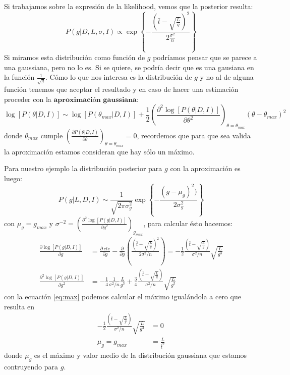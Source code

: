 \documentclass[aps,onecolumn,12pt,notitlepage]{revtex4-1}
\begin{document}
Si trabajamos sobre la expresión de la likelihood, vemos que la posterior resulta:
\begin{equation}
\displaystyle{P(g|D,L,\sigma,I) \propto \exp \left\{ -\frac{\left(\bar{t} - \sqrt{\frac{L}{g}}\right)^2}{2\frac{\sigma^2}{n}} \right\}}
\end{equation}
Si miramos esta distribución como función de $g$ podríamos pensar que se parece a una gaussiana, pero no lo es. Si se quiere, se podría decir que es una gausiana en la función $\frac{1}{\sqrt{g}}$. Cómo lo que nos interesa es la distribución de $g$ y no al de alguna función tenemos que aceptar el resultado y en caso de hacer una estimación proceder con la $\textbf{aproximación gaussiana}$:
\begin{equation}
 \displaystyle \log\left[P(\theta|D,I)\right] \sim \log\left[P(\theta_{max}|D,I)\right] + \frac{1}{2} \left(\frac{\partial^2 \log\left[P(\theta|D,I)\right] }{\partial \theta^2}\right)_{\theta =  \theta_{max}}\left(\theta-\theta_{max}\right)^2
\end{equation}
donde $\theta_{max}$ cumple $\left(\frac{\partial P(\theta|D,I)}{\partial \theta} \right)_{\theta= \theta_{max}} = 0$, recordemos que para que sea valida la aproximación estamos consideran que hay sólo un máximo.

Para nuestro ejemplo la distribución posterior para $g$ con la aproximación es luego:
\begin{equation}
P(g|L,D,I) \sim \frac{1}{\sqrt{2\pi\sigma^2_{g}}} \exp \left\{-\frac{(g-\mu_{g})^2)}{2\sigma_{g}^2}\right\}
\end{equation}
con $\mu_{g} = g_{max}$ y $ \sigma^{-2} = \left( \frac{\partial^2 \log \left[ P(g|D,I) \right] }{\partial g^2} \right)_{g_{max}}$, para calcular ésto hacemos:
\begin{align}
\frac{\partial \log \left[ P(g|D,I) \right]}{\partial g} &= \frac{\partial \ cte}{\partial g} - \frac{\partial}{\partial g}\left(\frac{\left(\bar{t}-\sqrt{\frac{L}{g}}\right)^2}{2\sigma^{2}/n}\right) = -\frac{1}{2}\frac{(\bar{t}-\sqrt{\frac{L}{g}})}{\sigma^2/n}\sqrt{\frac{L}{g^{3}}} 
\label{eq:max} \\
\frac{\partial^2 \log\left[P(g|D,I)\right] }{\partial g^2} &= -\frac{1}{4}\frac{1}{\sigma^2/n}\frac{L}{g^{3}} + \frac{3}{4} \frac{\left(\bar{t}-\sqrt{\frac{L}{g}}\right)}{\sigma^2/n}\sqrt{\frac{L}{g^{5}}}
\label{eq:curv}
\end{align}
con la ecuación \ref{eq:max} podemos calcular el máximo igualándola a cero que resulta en
\begin{equation}
\begin{aligned}
-\frac{1}{2} \frac{(\bar{t}-\sqrt{\frac{L}{g}})}{\sigma^2/n}\sqrt{\frac{L}{g^{3}}} &= 0 \\
\mu_{g} = g_{max} &= \frac{L}{\bar{t}^2}
\end{aligned}
\end{equation}
donde $\mu_{g}$ es el máximo y valor medio de la distribución gaussiana que estamos contruyendo para $g$.
\end{document}
